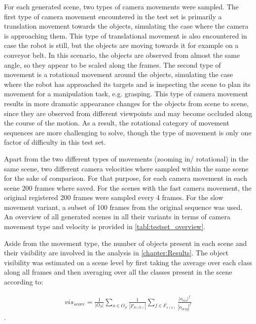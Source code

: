 For each generated scene, two types of camera movements were sampled. The first type of camera movement encountered in the test set is primarily a translation movement towards the objects, simulating the case where the camera is approaching them. This type of translational movement is also encountered in case the robot is still, but the objects are moving towards it for example on a conveyor belt.
In this scenario, the objects are observed from almost the same angle, so they appear to be scaled along the frames. The second type of movement is a rotational movement around the objects, simulating the case where the robot has approached its targets and is inspecting the scene to plan its movement for a manipulation task, e.g. grasping. This type of camera movement results in more dramatic appearance changes for the objects from scene to scene, since they are observed from different viewpoints and may become occluded along the course of the motion. As a result, the rotational category of movement sequences are more challenging to solve, though the type of movement is only one factor of difficulty in this test set. \par

Apart from the two different types of movements (zooming in/ rotational) in the same scene, two different camera velocities where sampled within the same scene for the sake of comparison. For that purpose, for each camera movement in each scene 200 frames where saved. For the scenes with the fast camera movement, the original registered 200 frames were sampled every 4 frames. For the slow movement variant, a subset of 100 frames from the original sequence was used. An overview of all generated scenes in all their variants in terms of camera movement type and velocity is provided in \tabref\ref{tabl:testset_overview}. \par 

Aside from the movement type, the number of objects present in each scene and their visibility are involved in the analysis in \autoref{chapter:Results}. The object visibility was estimated on a scene level by first taking the average over each class along all frames and then averaging over all the classes present in the scene according to:


\begin{gather}
\label{eq: visibility score}
         vis_{score} = \frac{1}{|O_S|}\sum_{o \in O_S} \frac{1}{|F_{S(O)}|}\sum_{f \in F_{s(o)}}\frac{|o_{vis}|^f}{|o_{orig}|^f}
\end{gather}.

